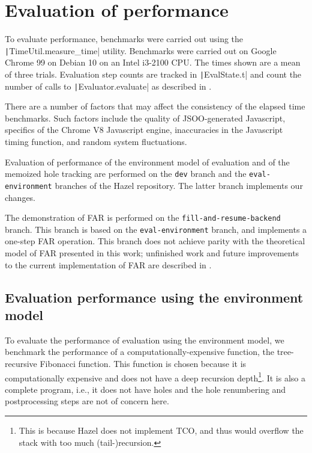 \chapter{Evaluation of performance}
\label{sec:evaluation}

To evaluate performance, benchmarks were carried out using the \texttt|TimeUtil.measure_time| utility. Benchmarks were carried out on Google Chrome 99 on Debian 10 on an Intel i3-2100 CPU. The times shown are a mean of three trials. Evaluation step counts are tracked in \texttt|EvalState.t| and count the number of calls to \texttt|Evaluator.evaluate| as described in .

There are a number of factors that may affect the consistency of the elapsed time benchmarks. Such factors include the quality of JSOO-generated Javascript, specifics of the Chrome V8 Javascript engine, inaccuracies in the Javascript timing function, and random system fluctuations.

Evaluation of performance of the environment model of evaluation and of the memoized hole tracking are performed on the \texttt{dev} branch and the \texttt{eval-environment} branches of the Hazel repository. The latter branch implements our changes.

The demonstration of FAR is performed on the \texttt{fill-and-resume-backend} branch. This branch is based on the \texttt{eval-environment} branch, and implements a one-step FAR operation. This branch does not achieve parity with the theoretical model of FAR presented in this work; unfinished work and future improvements to the current implementation of FAR are described in .

\section{Evaluation performance using the environment model}
\label{sec:evaluation-evalenv}

To evaluate the performance of evaluation using the environment model, we benchmark the performance of a computationally-expensive function, the tree-recursive Fibonacci function. This function is chosen because it is computationally expensive and does not have a deep recursion depth\footnote{This is because Hazel does not implement TCO, and thus would overflow the stack with too much (tail-)recursion.}. It is also a complete program, i.e., it does not have holes and the hole renumbering and postprocessing steps are not of concern here.

